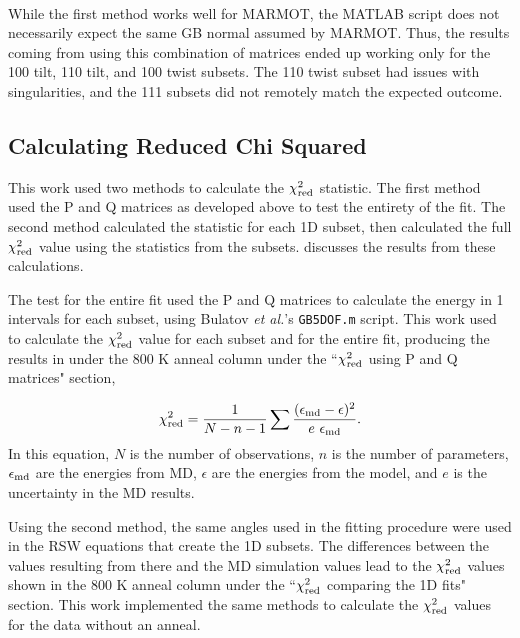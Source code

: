 \documentclass[twoside,senior]{BYUPhys}
\begin{document}
While the first method works well for MARMOT, the MATLAB\textsuperscript{\textregistered} script does not necessarily expect the same GB normal assumed by MARMOT.  Thus, the results coming from using this combination of matrices ended up working only for the \textlangle{}100\textrangle{} tilt, \textlangle{}110\textrangle{} tilt, and \textlangle{}100\textrangle{} twist subsets. The \textlangle{}110\textrangle{} twist subset had issues with singularities, and the \textlangle{}111\textrangle{} subsets did not remotely match the expected outcome.

\subsection{Calculating Reduced Chi Squared\label{chi2:chi2red}}
This work used two methods to calculate the $\chi^2_{\textnormal{red}}$ statistic.  The first method used the P and Q matrices as developed above to test the entirety of the fit.  The second method calculated the statistic for each 1D subset, then calculated the full $\chi^2_{\textnormal{red}}$ value using the statistics from the subsets.   discusses the results from these calculations.

The test for the entire fit used the P and Q matrices to calculate the energy in 1\textdegree{} intervals for each subset, using Bulatov \emph{et al.}'s \lstinline!GB5DOF.m! script.  This work used  to calculate the $\chi_{\textnormal{red}}^2$ value for each subset and for the entire fit, producing the results in  under the 800 K anneal column under the ``$\chi_{\textnormal{red}}^2$ using P and Q matrices" section,

\begin{equation}
\label{eq:chi2}
\chi^2_{\textnormal{red}} = \frac{1}{N-n-1} \sum \frac{(\epsilon_{\textnormal{md}} - \epsilon)^2}{e\ \epsilon_{\textnormal{md}}}.
\end{equation}
In this equation, $N$ is the number of observations, $n$ is the number of parameters, $\epsilon_{\textnormal{md}}$ are the energies from MD, $\epsilon$ are the energies from the model, and $e$ is the uncertainty in the MD results.

Using the second method, the same angles used in the fitting procedure were used in the RSW equations that create the 1D subsets.  The differences between the values resulting from there and the MD simulation values lead to the $\chi_{\textnormal{red}}^2$ values shown in the 800 K anneal column under the ``$\chi_{\textnormal{red}}^2$ comparing the 1D fits" section.  This work implemented the same methods to calculate the $\chi_{\textnormal{red}}^2$ values for the data without an anneal.
\end{document}
